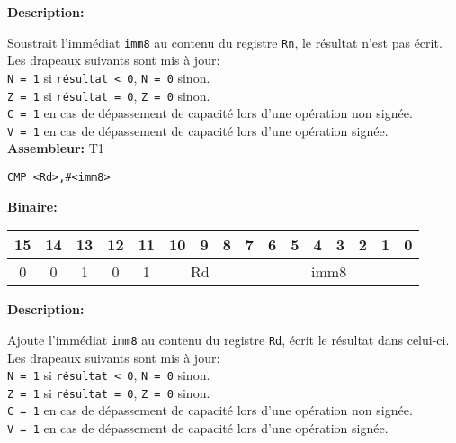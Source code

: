 \documentclass{article}
\begin{document}
    \textbf{Description: }

    Soustrait l'immédiat \texttt{imm8} au contenu du registre \texttt{Rn}, le résultat n'est pas écrit.\\
    Les drapeaux suivants sont mis à jour:\\
    \texttt{N = 1} si \texttt{résultat < 0}, \texttt{N = 0} sinon.\\
    \texttt{Z = 1} si \texttt{résultat = 0}, \texttt{Z = 0} sinon.\\
    \texttt{C = 1} en cas de dépassement de capacité lors d'une opération non signée.\\
    \texttt{V = 1} en cas de dépassement de capacité lors d'une opération signée.\\

    \textbf{Assembleur:} T1

    \begin{lstlisting}
CMP <Rd>,#<imm8>
    \end{lstlisting}

    \textbf{Binaire:}

    \begin{tabular}{| c c c c c c c c c c c c c c c c |}
        \hline
        15 & 14 & 13 & \multicolumn{1}{|c}{12} & 11 & \multicolumn{1}{|c}{10} & 9 & 8 & \multicolumn{1}{|c}{7} & 6 & 5 & 4 & 3 & 2 & 1 & 0 \\
        \hline
        0 & 0 & 1 & \multicolumn{1}{|c}{0} & 1 & \multicolumn{3}{|c|}{Rd} & \multicolumn{8}{|c|}{imm8} \\
        \hline
    \end{tabular}


    \textbf{Description: }

    Ajoute l'immédiat \texttt{imm8} au contenu du registre \texttt{Rd}, écrit le résultat dans celui-ci.\\
    Les drapeaux suivants sont mis à jour:\\
    \texttt{N = 1} si \texttt{résultat < 0}, \texttt{N = 0} sinon.\\
    \texttt{Z = 1} si \texttt{résultat = 0}, \texttt{Z = 0} sinon.\\
    \texttt{C = 1} en cas de dépassement de capacité lors d'une opération non signée.\\
    \texttt{V = 1} en cas de dépassement de capacité lors d'une opération signée.\\
\end{document}
